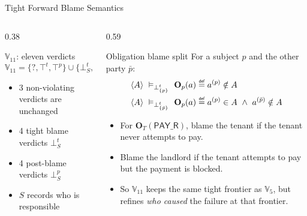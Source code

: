 \documentclass[9pt,aspectratio=169]{beamer}
\newcommand{\obl}[2][]{\mathbf{O}_{#1}(#2)}
\newcommand{\trace}[1]{\ensuremath{\langle #1 \rangle}\xspace}
\newcommand{\topt}{\top^t}
\newcommand{\topp}{\top^p}
\newcommand{\bottp}[1]{\mathbin{\bot^{t}_{#1}}}
\newcommand{\botpp}[1]{\mathbin{\bot^{p}_{#1}}}
\newcommand{\PAY}{\ensuremath{\mathsf{PAY\_R}}\xspace}
\newcommand{\mydef}{\mathrel{\overset{\makebox[0pt]{\mbox{\normalfont\tiny\sffamily def}}}{=}}}
\begin{document}
\begin{frame}{Tight Forward Blame Semantics}
\small
\begin{columns}[T,totalwidth=\textwidth]
\begin{column}{0.38\textwidth}
  \begin{block}{$\mathbb{V}_{11}$: eleven verdicts}
    \scriptsize
    \[
    \mathbb{V}_{11}=\{?,\topt,\topp\}\cup\{\bottp{S},\botpp{S}\mid S\subseteq\{T,L\}\}
    \]
    \begin{itemize}\setlength\itemsep{2pt}
      \item 3 non-violating verdicts are unchanged
      \item 4 tight blame verdicts $\bottp{S}$
      \item 4 post-blame verdicts $\botpp{S}$
      \item $S$ records who is responsible
    \end{itemize}
  \end{block}
\end{column}

\begin{column}{0.59\textwidth}
  \begin{block}{Obligation blame split}
    \scriptsize
    For a subject $p$ and the other party $\bar p$:
    \[
    \begin{aligned}
    \trace{A}\ \vDash_{\bottp{\{p\}}}\ \obl[p]{a}
      &\mydef a^{(p)}\notin A\\
    \trace{A}\ \vDash_{\bottp{\{\bar p\}}}\ \obl[p]{a}
      &\mydef a^{(p)}\in A\ \land\ a^{(\bar p)}\notin A
    \end{aligned}
    \]
    \begin{itemize}\setlength\itemsep{2pt}
      \item For $\obl[T]{\PAY}$, blame the tenant if the tenant never attempts to pay.
      \item Blame the landlord if the tenant attempts to pay but the payment is blocked.
      \item So $\mathbb{V}_{11}$ keeps the same tight frontier as $\mathbb{V}_5$, but refines \emph{who caused} the failure at that frontier.
    \end{itemize}
  \end{block}
\end{column}
\end{columns}
\end{frame}
\end{document}
